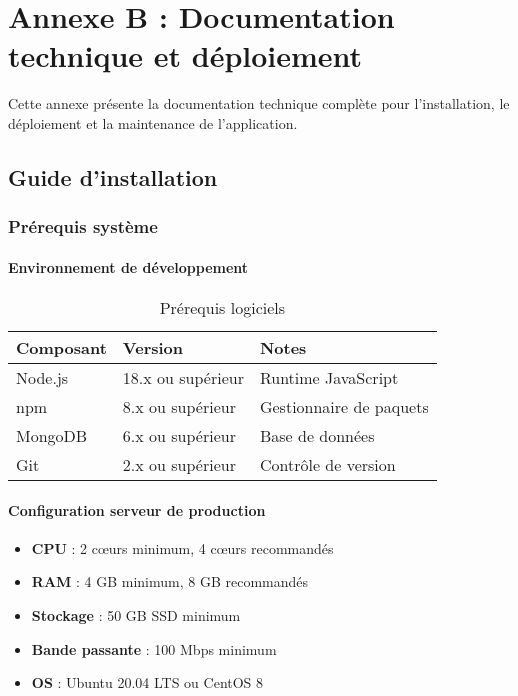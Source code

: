 \chapter{Annexe B : Documentation technique et déploiement}

Cette annexe présente la documentation technique complète pour l'installation, le déploiement et la maintenance de l'application.

\section{Guide d'installation}

\subsection{Prérequis système}

\subsubsection{Environnement de développement}

\begin{table}[h]
\centering
\begin{tabular}{|l|l|p{6cm}|}
\hline
\textbf{Composant} & \textbf{Version} & \textbf{Notes} \\
\hline
Node.js & 18.x ou supérieur & Runtime JavaScript \\
\hline
npm & 8.x ou supérieur & Gestionnaire de paquets \\
\hline
MongoDB & 6.x ou supérieur & Base de données \\
\hline
Git & 2.x ou supérieur & Contrôle de version \\
\hline
\end{tabular}
\caption{Prérequis logiciels}
\end{table}

\subsubsection{Configuration serveur de production}

\begin{itemize}
    \item \textbf{CPU} : 2 cœurs minimum, 4 cœurs recommandés
    \item \textbf{RAM} : 4 GB minimum, 8 GB recommandés
    \item \textbf{Stockage} : 50 GB SSD minimum
    \item \textbf{Bande passante} : 100 Mbps minimum
    \item \textbf{OS} : Ubuntu 20.04 LTS ou CentOS 8
\end{itemize}

